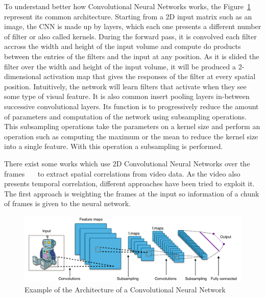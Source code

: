 To understand better how Convolutional Neural Networks works, the Figure~\ref{fig:cnn_architecture} represent its common architecture. Starting from a 2D input matrix such as an image, the CNN is made up by layers, which each one presents a different number of filter or also called kernels.
During the forward pass, it is convolved each filter accross the width and height of the input volume and compute do products between the entries of the filters and the input at any position. As it is slided the filter over the width and height of the input volume, it will be produced a 2-dimensional activation map that gives the responses of the filter at every spatial position.
Intuitively, the network will learn filters that activate when they see some type of visual feature. It is also common insert pooling layers in-between successive convolutional layers.
Its function is to progressively reduce the amount of parameters and computation of the network using subsampling operations. This subsampling operations take the parameters on a kernel size and perform an operation such as computing the maximum or the mean to reduce the kernel size into a single feature. With this operation a subsampling is performed.

There exist some works which use 2D Convolutional Neural Networks over the frames~\cite{gkioxari2015contextual}~\cite{yeung2015end}~\cite{ballas2015delving} to extract spatial correlations from video data. As the video also presents temporal correlation, different approaches have been tried to exploit it. The first approach is weighting the frames at the input\cite{yeung2015every} so information of a chunk of frames is given to the neural network.

\begin{figure}[ht]
\begin{center}
\includegraphics[width=1\linewidth]{img/stateofart/cnn_architecture}
\end{center}
\caption{Example of the Architecture of a Convolutional Neural Network}
\label{fig:cnn_architecture}
\end{figure}

